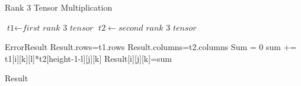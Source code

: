 \documentclass[journal,10pt]{IEEEtran}
\begin{document}
\begin{algorithm}
\caption{Rank 3 Tensor Multiplication}\label{euclid}
\begin{algorithmic}[1]
\State $\textit{t1} \gets \textit{first rank 3 tensor}$
\State $t2 \gets \textit{second rank 3 tensor}$

 \Return ErrorResult
\EndIf
Result.rows=t1.rows
Result.columns=t2.columns
Sum = 0
sum += t1[i][k][l]*t2[height-1-l][j][k]
\EndFor
Result[i][j][k]=sum


\EndFor
\EndFor
\EndFor
\Return Result


\EndFunction
\end{algorithmic}
\end{algorithm}




\clearpage

\newrefsection
{}
\onecolumn 




\ifCLASSOPTIONcaptionsoff
  \newpage
\fi





%
%
%


\end{document}
